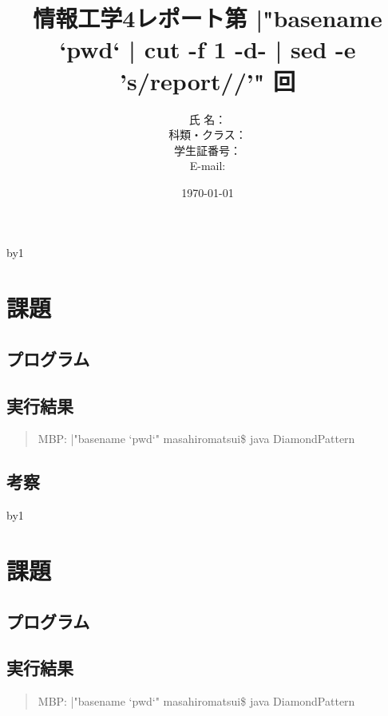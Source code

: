 \documentclass[11pt,a4paper]{jsarticle}
\title{情報工学4レポート第 {|"basename `pwd` | cut -f 1 -d- | sed -e 's/report//'"} 回 } %
\author{氏 名：  \\
        科類・クラス： \\
        学生証番号： \\
        E-mail: }
\date{\today}
\begin{document}
\maketitle
\newcount\cnt
{}


\def\javaClassName {DiamondPattern}
\advance\cnt by1
\section{課題 \number\cnt}

\subsection{プログラム}
\label{sec:prog-list1}

%
\subsection{実行結果}
\label{sec:results \number\cnt}

\begin{quote}           %
MBP: {|"basename `pwd`"} masahiromatsui\$ java \javaClassName \\

\end{quote}
\subsection{考察}



\def\javaClassName {DiamondPattern}
\advance\cnt by1
\section{課題 \number\cnt}

\subsection{プログラム}
\label{sec:prog-list1}

%
\subsection{実行結果}
\label{sec:results \number\cnt}

\begin{quote}           %
MBP: {|"basename `pwd`"} masahiromatsui\$ java \javaClassName \\

\end{quote}
\end{document}
